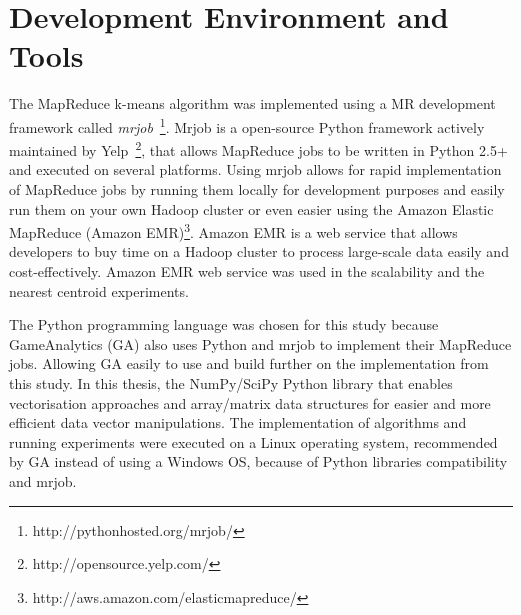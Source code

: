\section{Development Environment and Tools}
The MapReduce k-means algorithm was implemented using a MR development framework called \textit{mrjob}~\footnote{http://pythonhosted.org/mrjob/}. Mrjob is a open-source Python framework actively maintained by Yelp~\footnote{http://opensource.yelp.com/}, that allows MapReduce jobs to be written in Python 2.5+ and executed on several platforms. Using mrjob allows for rapid implementation of MapReduce jobs by running them locally for development purposes and easily run them on your own Hadoop cluster or even easier using the Amazon Elastic MapReduce (Amazon EMR)\footnote{http://aws.amazon.com/elasticmapreduce/}. Amazon EMR is a web service that allows developers to buy time on a Hadoop cluster to process large-scale data easily and cost-effectively. Amazon EMR web service was used in the scalability and the nearest centroid experiments.

The Python programming language was chosen for this study because GameAnalytics (GA) also uses Python and mrjob to implement their MapReduce jobs. Allowing GA easily to use and build further on the implementation from this study. In this thesis, the NumPy/SciPy Python library that enables vectorisation approaches and array/matrix data structures for easier and more efficient data vector manipulations. The implementation of algorithms and running experiments were executed on a Linux operating system, recommended by GA instead of using a Windows OS, because of Python libraries compatibility and mrjob.

\newpage
